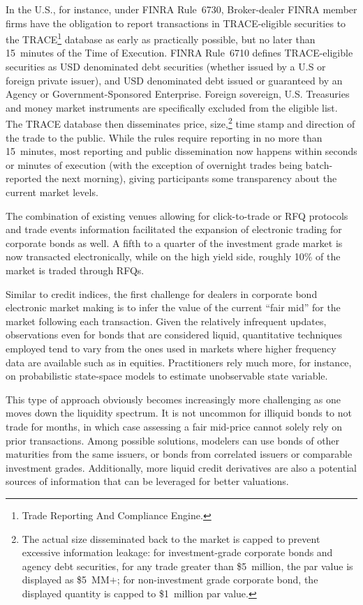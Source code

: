 In the U.S., for instance, under FINRA Rule~6730, Broker-dealer FINRA member firms have the obligation to report transactions in TRACE-eligible securities to the TRACE\footnote{Trade Reporting And Compliance Engine.} database as early as practically possible, but no later than 15~minutes of the Time of Execution. FINRA Rule~6710 defines TRACE-eligible securities as USD denominated debt securities (whether issued by a U.S or foreign private issuer), and USD denominated debt issued or guaranteed by an Agency or Government-Sponsored Enterprise. Foreign sovereign, U.S. Treasuries and money market instruments are specifically excluded from the eligible list. The TRACE database then disseminates price, size,\footnote{The actual size disseminated back to the market is capped to prevent excessive information leakage: for investment-grade corporate bonds and agency debt securities, for any trade greater than \$5~million, the par value is displayed as \$5~MM$+$; for non-investment grade corporate bond, the displayed quantity is capped to \$1~million par value.} time stamp and direction of the trade to the public. While the rules require reporting in no more than 15~minutes, most reporting and public dissemination now happens within seconds or minutes of execution (with the exception of overnight trades being batch-reported the next morning), giving participants some transparency about the current market levels.


The combination of existing venues allowing for click-to-trade or RFQ protocols and trade events information facilitated the expansion of electronic trading for corporate bonds as well. A fifth to a quarter of the investment grade market is now transacted electronically, while on the high yield side, roughly 10\% of the market is traded through RFQs.


Similar to credit indices, the first challenge for dealers in corporate bond electronic market making is to infer the value of the current ``fair mid'' for the market following each transaction. Given the relatively infrequent updates, observations even for bonds that are considered liquid, quantitative techniques employed tend to vary from the ones used in markets where higher frequency data are available such as in equities. Practitioners rely much more, for instance, on probabilistic state-space models to estimate unobservable state variable.


This type of approach obviously becomes increasingly more challenging as one moves down the liquidity spectrum. It is not uncommon for illiquid bonds to not trade for months, in which case assessing a fair mid-price cannot solely rely on prior transactions. Among possible solutions, modelers can use bonds of other maturities from the same issuers, or bonds from correlated issuers or comparable investment grades. Additionally, more liquid credit derivatives are also a potential sources of information that can be leveraged for better valuations. \label{in:exec_alg2}


